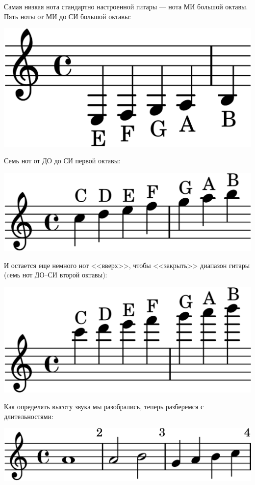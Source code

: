 Самая низкая нота стандартно настроенной гитары --- нота МИ большой октавы. Пять ноты от МИ до СИ большой октавы:
\begin{center}    
    \includegraphics{fig/notes/octave-big}
\end{center}

Семь нот от ДО до СИ первой октавы:
\begin{center}    
    \includegraphics{fig/notes/octave-first}
\end{center}

И остается еще немного нот <<вверх>>, чтобы <<закрыть>> диапазон гитары (cемь нот ДО--СИ второй октавы):
\begin{center}    
    \includegraphics{fig/notes/octave-second}
\end{center}

Как определять высоту звука мы разобрались, теперь разберемся с длительностями:
\begin{center}    
    \includegraphics{fig/notes/time-4-4}
\end{center}

